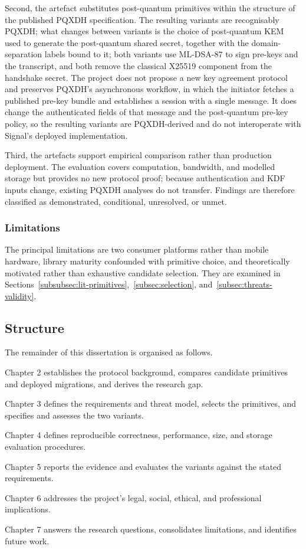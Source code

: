 Second, the artefact substitutes post-quantum primitives within the structure of the published PQXDH specification. The resulting variants are recognisably PQXDH; what changes between variants is the choice of post-quantum KEM used to generate the post-quantum shared secret, together with the domain-separation labels bound to it; both variants use ML-DSA-87 to sign pre-keys and the transcript, and both remove the classical X25519 component from the handshake secret. The project does not propose a new key agreement protocol and preserves PQXDH's asynchronous workflow, in which the initiator fetches a published pre-key bundle and establishes a session with a single message. It does change the authenticated fields of that message and the post-quantum pre-key policy, so the resulting variants are PQXDH-derived and do not interoperate with Signal's deployed implementation.

Third, the artefacts support empirical comparison rather than production deployment. The evaluation covers computation, bandwidth, and modelled storage but provides no new protocol proof; because authentication and KDF inputs change, existing PQXDH analyses do not transfer. Findings are therefore classified as demonstrated, conditional, unresolved, or unmet.

\subsubsection{Limitations}
\label{subsubsec:introduction-limitations}

The principal limitations are two consumer platforms rather than mobile hardware, library maturity confounded with primitive choice, and theoretically motivated rather than exhaustive candidate selection. They are examined in Sections~\ref{subsubsec:lit-primitives},~\ref{subsec:selection}, and~\ref{subsec:threats-validity}.

\subsection{Structure}
\label{subsec:structure}

The remainder of this dissertation is organised as follows.

Chapter 2 establishes the protocol background, compares candidate primitives and deployed migrations, and derives the research gap.

Chapter 3 defines the requirements and threat model, selects the primitives, and specifies and assesses the two variants.

Chapter 4 defines reproducible correctness, performance, size, and storage evaluation procedures.

Chapter 5 reports the evidence and evaluates the variants against the stated requirements.

Chapter 6 addresses the project's legal, social, ethical, and professional implications.

Chapter 7 answers the research questions, consolidates limitations, and identifies future work.
